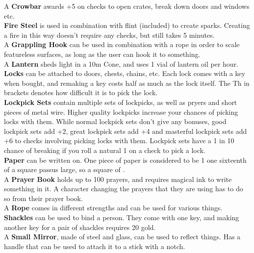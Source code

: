 A \textbf{Crowbar} awards +5 on checks to open crates, break down doors and windows etc.\\

\textbf{Fire Steel} is used in combination with flint (included) to create sparks.
Creating a fire in this way doesn't require any checks, but still takes 5 minutes.\\

A \textbf{Grappling Hook} can be used in combination with a rope in order to scale featureless surfaces, as long as the user can hook it to something.\\

A \textbf{Lantern} sheds light in a 10m Cone, and uses 1 vial of lantern oil per hour.\\

\textbf{Locks} can be attached to doors, chests, chains, etc.
Each lock comes with a key when bought, and remaking a key costs half as much as the lock itself.
The Th in brackets denotes how difficult it is to pick the lock.\\

\textbf{Lockpick Sets} contain multiple sets of lockpicks, as well as pryers and short pieces of metal wire.
Higher quality lockpicks increase your chances of picking locks with them.
While normal lockpick sets don't give any bonuses, good lockpick sets add +2, great lockpick sets add +4 and masterful lockpick sets add +6 to checks involving picking locks with them.
Lockpick sets have a 1 in 10 chance of breaking if you roll a natural 1 on a check to pick a lock.\\

\textbf{Paper} can be written on.
One piece of paper is considered to be 1 one sixteenth of a square passus large, so a square of  .\\

A \textbf{Prayer Book} holds up to 100 prayers, and requires magical ink to write something in it.
A character changing the prayers that they are using has to do so from their prayer book.\\

A \textbf{Rope} comes in different strengths and can be used for various things.\\

\textbf{Shackles} can be used to bind a person.
They come with one key, and making another key for a pair of shackles requires 20 gold.\\

A \textbf{Small Mirror}, made of steel and glass, can be used to reflect things.
Has a handle that can be used to attach it to a stick with a notch.\\

